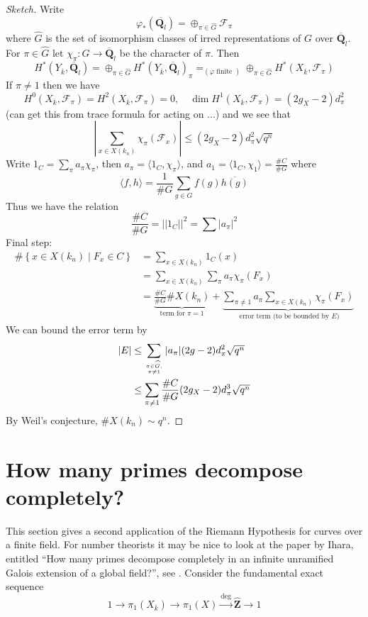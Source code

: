 \begin{proof}[Sketch]
Write
$$
\varphi_*(\overline{\mathbf{Q}_l}) =
\oplus_{\pi \in \widehat{G}} \mathcal{F}_{\pi}
$$
where $\widehat{G}$ is the set of isomorphism
classes of irred representations of
$G$ over $\overline{\mathbf{Q}}_l$. For $\pi \in \widehat{G}$
let $\chi_{\pi}: G \to \overline{\mathbf{Q}}_l$
be the character of $\pi$. Then
$$
H^*(Y_{\overline{k}}, \overline{\mathbf{Q}}_l) =
\oplus_{\pi\in \widehat{G}}
H^*(Y_{\overline{k}}, \overline{\mathbf{Q}}_l)_\pi
=_{(\varphi\text{ finite })}
\oplus_{\pi\in \widehat{G}}
H^*(X_{\overline{k}}, \mathcal{F}_\pi)
$$
If $\pi\neq 1$ then we have
$$
H^0(X_{\overline{k}}, \mathcal{F}_\pi) =
H^2(X_{\overline{k}}, \mathcal{F}_\pi) = 0,\quad
\dim H^1(X_{\overline{k}}, \mathcal{F}_\pi) = (2g_X - 2)d_\pi^2
$$
(can get this from trace formula for acting on ...) and we see that
$$
|\sum_{x \in X(k_n)} \chi_\pi(\mathcal{F}_x)| \leq
(2g_X - 2) d_\pi^2\sqrt{q^n}
$$
Write $1_C = \sum_\pi a_\pi \chi_\pi$, then
$a_\pi = \langle 1_C, \chi_\pi\rangle$, and
$a_1 = \langle 1_C, \chi_1\rangle = \frac{\# C}{\# G}$ where
$$
\langle f, h\rangle = \frac{1}{\# G}\sum_{g \in G} f(g)\overline{h(g)}
$$
Thus we have the relation
$$
\frac{\# C}{\# G} = ||1_C||^2 = \sum|a_\pi|^2
$$
Final step:
\begin{align*}
\#\left\{x \in X(k_n) \mid F_x \in C\right\}
& =
\sum_{x \in X(k_n)} 1_C(x) \\
& =
\sum_{x \in X(k_n)} \sum_\pi a_\pi \chi_\pi(F_x) \\
& =
\underbrace{\frac{\# C}{\# G} \# X(k_n)}_{
\text{term for }\pi = 1}
+
\underbrace{\sum_{\pi\neq 1}a_\pi\sum_{x\in X(k_n)}\chi_\pi(F_x)}_{
\text{ error term (to be bounded by }E)}
\end{align*}
We can bound the error term by
\begin{align*}
|E|
& \leq
\sum_{\pi \in \widehat{G}, \atop \pi \neq 1}
|a_\pi| (2g - 2) d_\pi^2 \sqrt{q^n} \\
& \leq
\sum_{\pi \neq 1} \frac{\# C}{\# G} (2g_X - 2) d_\pi^3 \sqrt{q^n}
\end{align*}
By Weil's conjecture, $\# X(k_n)\sim q^n$.
\end{proof}

\section{How many primes decompose completely?}
\label{trace-section-how-many}
This section gives a second application of the Riemann Hypothesis for
curves over a finite field. For number theorists it may be nice
to look at the paper by Ihara, entitled
``How many primes decompose completely in an infinite unramified Galois
extension of a global field?'', see \cite{Ihara}.
Consider the fundamental exact sequence
$$
1 \to
\pi_1(X_{\overline{k}}) \to
\pi_1(X) \xrightarrow{\deg}
\widehat{\mathbf{Z}} \to 1
$$

